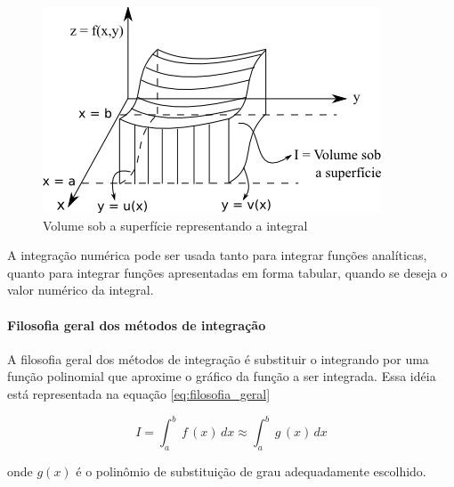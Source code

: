 \begin{figure}[htb]
 \centering
    \includegraphics[scale=0.8]{capitulos/capitulo2/figuras/intro2.png}
    \caption{Volume sob a superfície representando a integral}
    \label{fig:intro2}
\end{figure}

A integra\c{c}\~ao num\'erica pode ser usada tanto para integrar fun\c{c}\~oes anal\'iticas, quanto para integrar fun\c{c}\~oes apresentadas em forma tabular, quando se deseja o valor num\'erico da integral.

\paragraph{Filosofia geral dos m\'etodos de integra\c{c}\~ao}

A filosofia geral dos m\'etodos de integra\c{c}\~ao \'e substituir o integrando por uma fun\c{c}\~ao polinomial que aproxime o gr\'afico da fun\c{c}\~ao a ser integrada. Essa id\'eia est\'a representada na equa\c{c}\~ao \ref{eq:filosofia_geral}

\begin{equation}
   I = \int_a^b \, f\,(x) \, dx \approx \int_a^b \, g\,(x) \, dx
   \label{eq:filosofia_geral}
\end{equation}

\noindent
onde $g(x)$ \'e o polin\^omio de substitui\c{c}\~ao de grau adequadamente escolhido.

